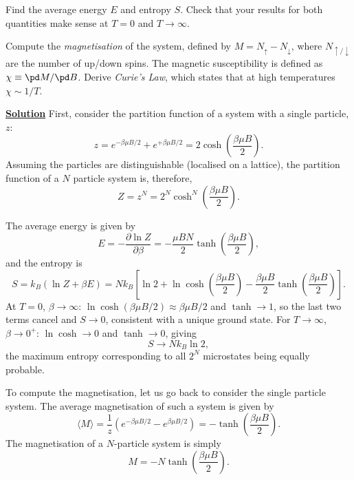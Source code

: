 Find the average energy $E$ and entropy $S$. Check that your results for both
quantities make sense at $T=0$ and $T\to\infty$.

Compute the \textit{magnetisation} of the system, defined by $M = N_\uparrow -
N_\downarrow$, where $N_{\uparrow/\downarrow}$ are the number of up/down spins.
The magnetic susceptibility is defined as $\chi \equiv \pd M/\pd B$. Derive
\textit{Curie's Law}, which states that at high temperatures $\chi \sim 1/T$.

\noindent \underline{\textbf{Solution}} First, consider the partition function of a system with a single particle, $z$:
\begin{equation}
    z = e^{-\beta\mu B/2} + e^{+\beta\mu B/2} = 2\cosh\left(\frac{\beta\mu B}{2}\right).
\end{equation}
Assuming the particles are distinguishable (localised on a lattice), the partition function of a $N$ particle system is, therefore,
\begin{equation}
    Z = z^N = 2^N\cosh^N\left(\frac{\beta\mu B}{2}\right).
\end{equation}

The average energy is given by
\begin{equation}
    E  = - \frac{\partial\ln Z}{\partial\beta} = -\frac{\mu BN}{2}\tanh\left(\frac{\beta\mu B}{2}\right),
\end{equation}
and the entropy is
\begin{equation}
    S = k_B(\ln Z + \beta E)
    = Nk_B\left[\ln 2 + \ln\cosh\!\left(\frac{\beta\mu B}{2}\right)
    - \frac{\beta\mu B}{2}\tanh\!\left(\frac{\beta\mu B}{2}\right)\right].
\end{equation}
At $T=0$, $\beta\to\infty$: $\ln\cosh(\beta\mu B/2)\approx \beta\mu B/2$ and $\tanh\to 1$, so the last two terms cancel and $S\to 0$, consistent with a unique ground state.
For $T\to\infty$, $\beta\to 0^+$: $\ln\cosh\to 0$ and $\tanh\to 0$, giving
\begin{equation}
    S \to Nk_B\ln 2,
\end{equation}
the maximum entropy corresponding to all $2^N$ microstates being equally probable.

To compute the magnetisation, let us go back to consider the single particle system. The average magnetisation of such a system is given by
\begin{equation}
    \langle M\rangle = \frac{1}{z}(e^{-\beta\mu B/2}- e^{\beta\mu B/2}) = -\tanh\left(\frac{\beta\mu B}{2}\right).
\end{equation}
The magnetisation of a $N$-particle system is simply
\begin{equation}
    M = -N \tanh\left(\frac{\beta\mu B}{2}\right).
\end{equation}

